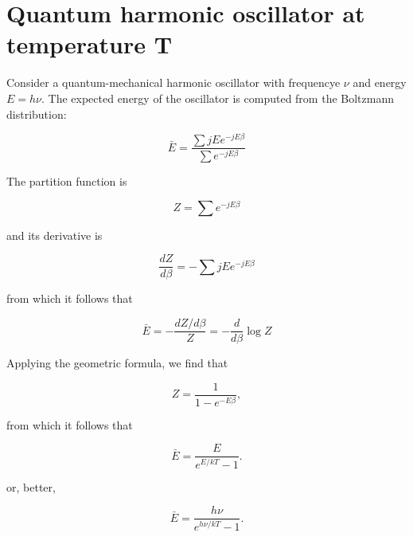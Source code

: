 


\section{Quantum harmonic oscillator at temperature T}



Consider a quantum-mechanical harmonic oscillator with frequencye $\nu$ and energy $E = h\nu$.  The expected energy of the oscillator is computed from the Boltzmann distribution:

\begin{equation}
\bar{E} = \frac{\sum jE e^{-jE\beta}}{\sum e^{-jE\beta}}
\end{equation}

The partition function is

\begin{equation}
Z = \sum e^{-jE\beta}
\end{equation}

and its derivative is


\begin{equation}
\frac{dZ}{d\beta} =  - \sum jE e^{-jE\beta}
\end{equation}

from which it follows that

\begin{equation}
\bar{E} = - \frac{dZ/d\beta}{Z} = - \frac{d}{d\beta} \log Z
\end{equation}

Applying the geometric formula, we find that

\begin{equation}
Z = \frac{1}{1 - e^{-E\beta}},
\end{equation}

from which it follows that

\begin{equation}
\bar{E} = \frac{E}{e^{E/kT} - 1}.
\end{equation}


or, better,


\begin{equation}
\bar{E} = \frac{h\nu}{e^{h\nu/kT} - 1}.
\end{equation}
